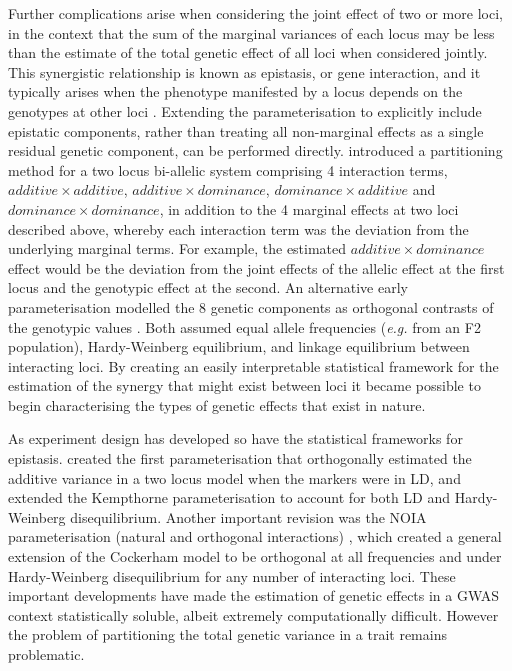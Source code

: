 Further complications arise when considering the joint effect of two or more loci, in the context that the sum of the marginal variances of each locus may be less than the estimate of the total genetic effect of all loci when considered jointly. This synergistic relationship is known as epistasis, or gene interaction, and it typically arises when the phenotype manifested by a locus depends on the genotypes at other loci \citep{Carlborg2004}. Extending the parameterisation to explicitly include epistatic components, rather than treating all non-marginal effects as a single residual genetic component, can be performed directly. \citet{Kempthorne1954} introduced a partitioning method for a two locus bi-allelic system comprising 4 interaction terms, $additive \times additive$, $additive \times dominance$, $dominance \times additive$ and $dominance \times dominance$, in addition to the 4 marginal effects at two loci described above, whereby each interaction term was the deviation from the underlying marginal terms. For example, the estimated $additive \times dominance$ effect would be the deviation from the joint effects of the allelic effect at the first locus and the genotypic effect at the second. An alternative early parameterisation modelled the 8 genetic components as orthogonal contrasts of the genotypic values \citep{Cockerham1954}. Both assumed equal allele frequencies (\emph{e.g.} from an F2 population), Hardy-Weinberg equilibrium, and linkage equilibrium between interacting loci. By creating an easily interpretable statistical framework for the estimation of the synergy that might exist between loci it became possible to begin characterising the types of genetic effects that exist in nature.

As experiment design has developed so have the statistical frameworks for epistasis. \citet{Kimura1965} created the first parameterisation that orthogonally estimated the additive variance in a two locus model when the markers were in LD, and \citet{Mao2006} extended the Kempthorne parameterisation to account for both LD and Hardy-Weinberg disequilibrium. Another important revision was the NOIA parameterisation (natural and orthogonal interactions) \citep{Alvarez-Castro2007, Alvarez-Castro2008}, which created a general extension of the Cockerham model to be orthogonal at all frequencies and under Hardy-Weinberg disequilibrium for any number of interacting loci. These important developments have made the estimation of genetic effects in a GWAS context statistically soluble, albeit extremely computationally difficult. However the problem of partitioning the total genetic variance in a trait remains problematic.

